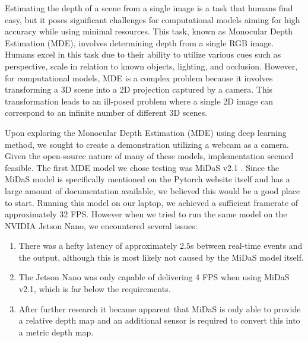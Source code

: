 \documentclass{article}[a4paper]
\begin{document}
Estimating the depth of a scene from a single image is a task that humans find easy, but it poses significant challenges for computational models aiming for high accuracy while using minimal resources. This task, known as Monocular Depth Estimation (MDE), involves determining depth from a single RGB image. Humans excel in this task due to their ability to utilize various cues such as perspective, scale in relation to known objects, lighting, and occlusion. However, for computational models, MDE is a complex problem because it involves transforming a 3D scene into a 2D projection captured by a camera. This transformation leads to an ill-posed problem where a single 2D image can correspond to an infinite number of different 3D scenes.
\newline

Upon exploring the Monocular Depth Estimation (MDE) using deep learning method, we sought to create a demonstration utilizing a webcam as a camera. Given the open-source nature of many of these models, implementation seemed feasible. The first MDE model we chose testing was MiDaS v2.1 \cite{MiDaS}. Since the MiDaS model is specifically mentioned on the Pytorch website itself and has a large amount of documentation available, we believed this would be a good place to start. Running this model on our laptop, we achieved a sufficient framerate of approximately 32 FPS. However when we tried to run the same model on the NVIDIA Jetson Nano, we encountered several issues:
\begin{enumerate}
    \item There was a hefty latency of approximately 2.5\si{s} between real-time events and the output, although this is most likely not caused by the MiDaS model itself.
    \item The Jetson Nano was only capable of delivering 4 FPS when using MiDaS v2.1, which is far below the requirements.
    \item After further research it became apparent that MiDaS is only able to provide a relative depth map and an additional sensor is required to convert this into a metric depth map.
\end{enumerate}
\end{document}
